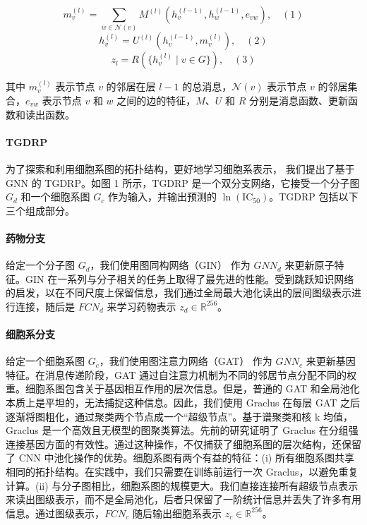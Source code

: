 \begin{equation}
m^{(l)}_v = \sum_{w \in \mathcal{N}(v)} M^{(l)}\left(h^{(l-1)}_v, h^{(l-1)}_w, e_{vw}\right), \quad (1)
\end{equation}
\begin{equation}
h^{(l)}_v = U^{(l)}\left(h^{(l-1)}_v, m^{(l)}_v\right), \quad (2)
\end{equation}
\begin{equation}
z_l = R\left(\{h^{(l)}_v \mid v \in G\}\right), \quad (3)
\end{equation}

其中 $m^{(l)}_v$ 表示节点 $v$ 的邻居在层 $l-1$ 的总消息，$\mathcal{N}(v)$ 表示节点 $v$ 的邻居集合，$e_{vw}$ 表示节点 $v$ 和 $w$ 之间的边的特征，$M$、$U$ 和 $R$ 分别是消息函数、更新函数和读出函数。

\paragraph{TGDRP}
为了探索和利用细胞系图的拓扑结构，更好地学习细胞系表示，
我们提出了基于 GNN 的 TGDRP。如图 1 所示，TGDRP 是一个双分支网络，它接受一个分子图 $G_d$ 和一个细胞系图 $G_c$ 作为输入，并输出预测的 $\ln(\text{IC}_{50})$。TGDRP 包括以下三个组成部分。

\paragraph{药物分支}
给定一个分子图 $G_d$，我们使用图同构网络（GIN）\cite{Xu2019} 作为 $GNN_d$ 来更新原子特征。GIN 在一系列与分子相关的任务上取得了最先进的性能\cite{Hu2020}。受到跳跃知识网络的启发，以在不同尺度上保留信息\cite{Xu2018}，我们通过全局最大池化读出的层间图级表示进行连接，随后是 $FCN_d$ 来学习药物表示 $z_d \in \mathbb{R}^{256}$。

\paragraph{细胞系分支}
给定一个细胞系图 $G_c$，我们使用图注意力网络（GAT）\cite{Velickovic2018} 作为 $GNN_c$ 来更新基因特征。在消息传递阶段，GAT 通过自注意力机制为不同的邻居节点分配不同的权重。细胞系图包含关于基因相互作用的层次信息\cite{Erwin2009}。但是，普通的 GAT 和全局池化本质上是平坦的，无法捕捉这种信息\cite{Ying2018}。因此，我们使用 Graclus\cite{Dhillon2007} 在每层 GAT 之后逐渐将图粗化，通过聚类两个节点成一个“超级节点”。基于谱聚类和核 k 均值，Graclus 是一个高效且无模型的图聚类算法\cite{Bianchi2020}。先前的研究证明了 Graclus 在分组强连接基因方面的有效性。通过这种操作，不仅捕获了细胞系图的层次结构，还保留了 CNN 中池化操作的优势。细胞系图有两个有益的特征：(i) 所有细胞系图共享相同的拓扑结构。在实践中，我们只需要在训练前运行一次 Graclus，以避免重复计算。(ii) 与分子图相比，细胞系图的规模更大。我们直接连接所有超级节点表示来读出图级表示，而不是全局池化，后者只保留了一阶统计信息并丢失了许多有用信息。通过图级表示，$FCN_c$ 随后输出细胞系表示 $z_c \in \mathbb{R}^{256}$。

